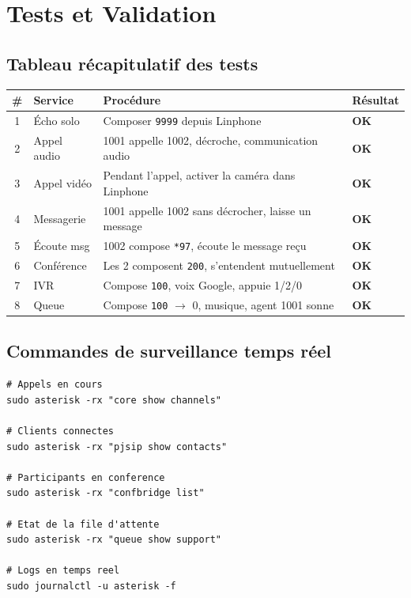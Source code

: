 \documentclass[a4paper,11pt]{report}
\begin{document}
\chapter{Tests et Validation}

\section{Tableau récapitulatif des tests}

\begin{center}
\begin{tabularx}{\textwidth}{clXl}
\toprule
\rowcolor{primarylight}\textbf{\#} & \textbf{Service} & \textbf{Procédure} & \textbf{Résultat}\\
\midrule
1 & Écho solo & Composer \texttt{9999} depuis Linphone & \textcolor{success}{\textbf{OK}}\\
2 & Appel audio & 1001 appelle 1002, décroche, communication audio & \textcolor{success}{\textbf{OK}}\\
3 & Appel vidéo & Pendant l'appel, activer la caméra dans Linphone & \textcolor{success}{\textbf{OK}}\\
4 & Messagerie & 1001 appelle 1002 sans décrocher, laisse un message & \textcolor{success}{\textbf{OK}}\\
5 & Écoute msg & 1002 compose \texttt{*97}, écoute le message reçu & \textcolor{success}{\textbf{OK}}\\
6 & Conférence & Les 2 composent \texttt{200}, s'entendent mutuellement & \textcolor{success}{\textbf{OK}}\\
7 & IVR & Compose \texttt{100}, voix Google, appuie 1/2/0 & \textcolor{success}{\textbf{OK}}\\
8 & Queue & Compose \texttt{100} $\to$ 0, musique, agent 1001 sonne & \textcolor{success}{\textbf{OK}}\\
\bottomrule
\end{tabularx}
\end{center}

\section{Commandes de surveillance temps réel}

\begin{codebox}
\begin{lstlisting}
# Appels en cours
sudo asterisk -rx "core show channels"

# Clients connectes
sudo asterisk -rx "pjsip show contacts"

# Participants en conference
sudo asterisk -rx "confbridge list"

# Etat de la file d'attente
sudo asterisk -rx "queue show support"

# Logs en temps reel
sudo journalctl -u asterisk -f
\end{lstlisting}
\end{codebox}
\end{document}
